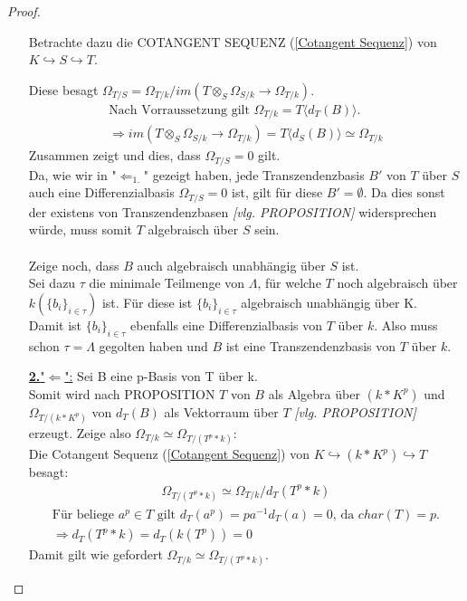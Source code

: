 \documentclass[10pt,a4paper]{report}
\newcommand{\comment}[1]{}
\newcommand{\divR}[2]{\Omega_{#1/#2}}
\newcommand{\divf}[1]{d_{#1}}
\newcommand{\Tensor}[3]{#1 \otimes_{#2} #3}
\newcommand{\immage}[1]{im(#1)}
\begin{document}
\begin{proof}
\begin{itemize}
Betrachte dazu die COTANGENT SEQUENZ (\cref{Cotangent Sequenz}) von $K \hookrightarrow S \hookrightarrow T$.
\begin{center}
\end{center}
Diese besagt $\divR{T}{S} = \divR{T}{k} / \immage{\Tensor{T}{S}{\divR{S}{k}} \longrightarrow \divR{T}{k}}$.
\begin{gather*}
\text{Nach Vorraussetzung gilt } \divR{T}{k} = T \langle \divf{T}(B) \rangle. \\
\Rightarrow \immage{\Tensor{T}{S}{\divR{S}{k}} \longrightarrow \divR{T}{k}} = T\langle \divf{S}(B) \rangle \simeq \divR{T}{k}
\end{gather*}
Zusammen zeigt und dies, dass $\divR{T}{S} = 0$ gilt.\\
Da, wie wir in "$\Leftarrow_{1.}$" gezeigt haben, jede Transzendenzbasis $B'$ von $T$ über $S$ auch eine Differenzialbasis $\divR{T}{S} = 0$ ist, gilt für diese $B' = \emptyset$. Da dies sonst der existens von Transzendenzbasen \textit{[vlg. PROPOSITION]} \comment{\label{*Transzendenzbasis existiert immer}} widersprechen würde, muss somit $T$ algebraisch über $S$ sein.\\
\ \\
Zeige noch, dass $B$ auch algebraisch unabhängig über $S$ ist.\\
Sei dazu $\tau$ die minimale Teilmenge von $\Lambda$, für welche $T$ noch algebraisch über $k(\lbrace b_i \rbrace_{i \in \tau})$ ist. Für diese ist $\lbrace b_i \rbrace_{i \in \tau}$ algebraisch unabhängig über K.\\
Damit ist $\lbrace b_i \rbrace_{i \in \tau}$ ebenfalls eine Differenzialbasis von $T$ über $k$. Also muss schon $\tau = \Lambda$ gegolten haben und $B$ ist eine Transzendenzbasis von $T$ über $k$.
\item[\underline{\textbf{2.}"$\Leftarrow$":}] Sei B eine p-Basis von T über k.\\
Somit wird nach PROPOSITION \comment{\label{*p-Basis ist minnimaler Erzeuger von T als Algebra}} $T$ von $B$ als Algebra über $(k * K^p)$ und $\divR{T}{(k * K^p)}$ von $\divf{T}(B)$ als Vektorraum über $T$ 
\textit{[vlg. PROPOSITION]} \comment{\label{*Differenzial vererbt Erzeugendensystem}} erzeugt. Zeige also $\divR{T}{k} \simeq \divR{T}{(T^p * k)}$:\\
Die Cotangent Sequenz (\cref{Cotangent Sequenz}) von $K \hookrightarrow (k * K^p) \hookrightarrow T$ besagt:
\begin{gather*}
\divR{T}{(T^p * k)} \simeq \divR{T}{k}/\divf{T}(T^p * k)
\end{gather*}
\begin{gather*}
\text{Für beliege } a^p \in T \text{ gilt } \divf{T}(a^p) = pa^{-1}\divf{T}(a) = 0 \text{,  da }char(T) = p.\\
\Rightarrow \divf{T}(T^p * k) = \divf{T}(k(T^p)) = 0
\end{gather*}
Damit gilt wie gefordert $\divR{T}{k} \simeq \divR{T}{(T^p * k)}$.


\end{itemize}
\end{proof}
\end{document}
